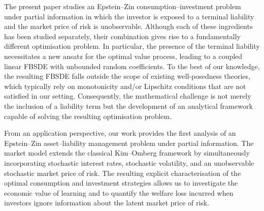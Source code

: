 \documentclass[12,reqno]{amsart}
\numberwithin{equation}{section}
\begin{document}
The present paper studies an Epstein--Zin consumption--investment problem under partial information in which the investor is exposed to a terminal liability and the market price of risk is unobservable. Although each of these ingredients has been studied separately, their combination gives rise to a fundamentally different optimisation problem. In particular, the presence of the terminal liability necessitates a new ansatz for the optimal value process, leading to a coupled linear FBSDE with unbounded random coefficients. To the best of our knowledge, the resulting FBSDE falls outside the scope of existing well-posedness theories, which typically rely on monotonicity and/or Lipschitz conditions that are not satisfied in our setting. Consequently, the mathematical challenge is not merely the inclusion of a liability term but the development of an analytical framework capable of solving the resulting optimisation problem.

From an application perspective, our work provides the first analysis of an Epstein--Zin asset--liability management problem under partial information. The market model extends the classical Kim--Omberg framework \cite{kim1996dynamic} by simultaneously incorporating stochastic interest rates, stochastic volatility, and an unobservable stochastic market price of risk. The resulting explicit characterisation of the optimal consumption and investment strategies allows us to investigate the economic value of learning and to quantify the welfare loss incurred when investors ignore information about the latent market price of risk.
\end{document}
